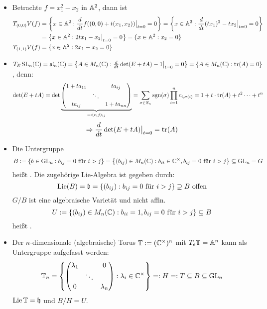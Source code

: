 	\begin{itemize}
		\item Betrachte $f = x_1^2-x_2$ in $\aff^2$, dann ist
		\begin{equation}
		\begin{aligned}
			T_{(0,0)}V(f) &= \penbrace*{x \in \aff^2 : \frac{d}{dt} f( (0,0) + t(x_1,x_2)) \big|_{t=0} = 0 } = \penbrace*{x \in \aff^2 : \frac{d}{dt} (tx_1)^2 - tx_2 \big|_{t=0} = 0} \\
			&= \penbrace*{x \in \aff^2 : 2tx_1 - x_2 \big|_{t=0} = 0} = \{ x \in \aff^2 : x_2 = 0 \} \\
			T_{(1,1)}V(f) &= \{ x \in \aff^2 : 2x_1 - x_2 = 0 \}
		\end{aligned}
		\end{equation}
		\item $T_{E}\SL_n(\CC) = \slie_n(\CC) = \penbrace*{A \in M_n(\CC) : \frac{d}{dt} \det(E + tA) - 1 \big|_{t=0} = 0} = \{A \in M_n(\CC) : \tr(A) = 0 \}$, denn:
		\[ \det(E+tA) = \det \underbrace{\begin{pmatrix}
		1+ta_{11} &  & ta_{ij} \\ 
		& \ddots &  \\ 
		ta_{ij} &  & 1+ta_{nn}
		\end{pmatrix}}_{=:(c_ij)_{ij}} = \sum\limits_{\sigma \in S_n} \sgn(\sigma) \prod\limits_{i=1}^n c_{i,\sigma(i)} = 1 + t \cdot \tr(A) + t^2\dots + t^n \]
		\[ \Rightarrow \frac{d}{dt} \det(E+tA) \big|_{t=0} = \tr(A) \]
		\item Die Untergruppe
		\[ B := \penbrace*{ b \in \GL_n : b_{ij} = 0 \text{ für } i>j} = \penbrace*{(b_{ij}) \in M_n(\CC) : b_{ii} \in \CC^\times, b_{ij} = 0 \text{ für } i>j} \subseteq \GL_n = G\]
		heißt . Die zugehörige Lie-Algebra ist gegeben durch:
		\[ \Lie(B) = \mathfrak{b} = \penbrace{ (b_{ij}) : b_{ij} = 0 \text{ für } i > j} \supseteq B \text{ offen} \]
		$G/B$ ist eine algebraische Varietät und nicht affin.
		\[U := \penbrace*{(b_{ij}) \in M_n(\CC) : b_{ii} = 1, b_{ij} = 0 \text{ für } i>j} \subseteq B\]
		heißt .
		\item Der $n$-dimensionale (algebraische) Torus $\mathbb{T}:=(\CC^\times)^n$ mit $T_e\mathbb{T} = \aff^n$ kann als Untergruppe aufgefasst werden:
		\[ \mathbb{T}_n = \penbrace*{ \begin{pmatrix}
			\lambda_1 &  & 0 \\ 
			& \ddots &  \\ 
			0 &  & \lambda_n
			\end{pmatrix} : \lambda_i \in \CC^\times} =: H =: T \subseteq B \subseteq \GL_n \]
		$\Lie{\mathbb{T}} = \mathfrak{h}$ und $B/H = U$.
		
	\end{itemize}


